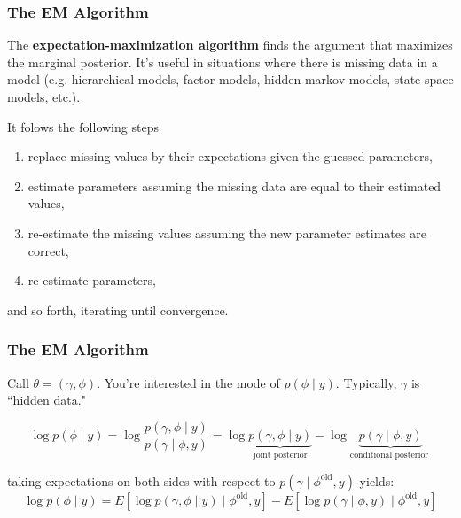 \documentclass{beamer}
\begin{document}
\begin{frame}[fragile]
\frametitle{The EM Algorithm}

The {\bf expectation-maximization algorithm} finds the argument that maximizes the marginal posterior. It's useful in situations where there is missing data in a model (e.g. hierarchical models, factor models, hidden markov models, state space models, etc.). 
\newline

It folows the following steps
\begin{enumerate}
\item replace missing values by their expectations given the guessed parameters, 
\item estimate parameters assuming the missing data are equal to their estimated values, 
\item re-estimate the missing values assuming the new parameter estimates are correct,
\item re-estimate parameters, 
\end{enumerate}
and so forth, iterating until convergence.

\end{frame}


\begin{frame}[fragile]
\frametitle{The EM Algorithm}

Call $\theta = (\gamma, \phi)$. You're interested in the mode of $p(\phi \mid y)$. Typically, $\gamma$ is ``hidden data."
\newline

$$
\log p(\phi \mid y) = \log \frac{p(\gamma, \phi \mid y)}{p(\gamma \mid \phi, y)} = \log \underbrace{p(\gamma, \phi \mid y)}_{ \text{joint posterior} } - \log \underbrace{p(\gamma \mid \phi, y)}_{\text{conditional posterior }}
$$
\pause

taking expectations on both sides with respect to $p(\gamma \mid \phi^{\text{old}}, y)$ yields:
$$
\log p(\phi \mid y) =  E\left[ \log p(\gamma, \phi \mid y) \mid \phi^{\text{old}}, y \right] - E\left[\log p(\gamma \mid \phi, y) \mid \phi^{\text{old}}, y \right]
$$




\end{frame}
\end{document}
